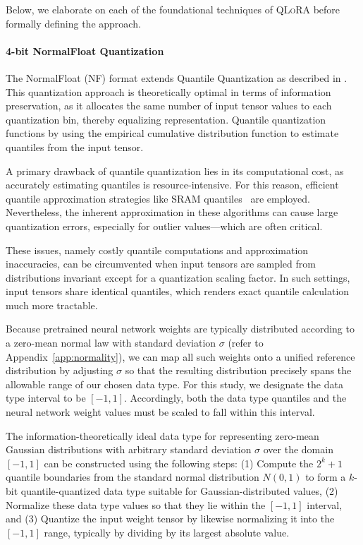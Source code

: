 Below, we elaborate on each of the foundational techniques of \textsc{QLoRA} before formally defining the approach.

\paragraph{4-bit NormalFloat Quantization} The NormalFloat (NF) format extends Quantile Quantization as described in \citep{dettmers2022optimizers}. This quantization approach is theoretically optimal in terms of information preservation, as it allocates the same number of input tensor values to each quantization bin, thereby equalizing representation. Quantile quantization functions by using the empirical cumulative distribution function to estimate quantiles from the input tensor.

A primary drawback of quantile quantization lies in its computational cost, as accurately estimating quantiles is resource-intensive. For this reason, efficient quantile approximation strategies like SRAM quantiles~\citep{dettmers2022optimizers} are employed. Nevertheless, the inherent approximation in these algorithms can cause large quantization errors, especially for outlier values—which are often critical.

These issues, namely costly quantile computations and approximation inaccuracies, can be circumvented when input tensors are sampled from distributions invariant except for a quantization scaling factor. In such settings, input tensors share identical quantiles, which renders exact quantile calculation much more tractable.

Because pretrained neural network weights are typically distributed according to a zero-mean normal law with standard deviation $\sigma$ (refer to Appendix~\ref{app:normality}), we can map all such weights onto a unified reference distribution by adjusting $\sigma$ so that the resulting distribution precisely spans the allowable range of our chosen data type. For this study, we designate the data type interval to be $[-1, 1]$. Accordingly, both the data type quantiles and the neural network weight values must be scaled to fall within this interval.

The information-theoretically ideal data type for representing zero-mean Gaussian distributions with arbitrary standard deviation $\sigma$ over the domain $[-1, 1]$ can be constructed using the following steps: (1) Compute the $2^k+1$ quantile boundaries from the standard normal distribution $N(0, 1)$ to form a $k$-bit quantile-quantized data type suitable for Gaussian-distributed values, (2) Normalize these data type values so that they lie within the $[-1, 1]$ interval, and (3) Quantize the input weight tensor by likewise normalizing it into the $[-1, 1]$ range, typically by dividing by its largest absolute value.

